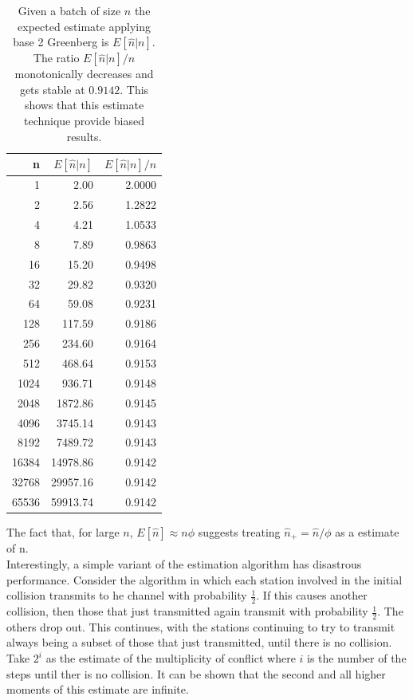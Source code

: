 \documentclass[12pt,a4paper]{report}
\begin{document}
\begin{table}[H]
\caption[\emph{Basic Greenberg} Expected Estimate]{Given a batch of size $n$ the expected estimate applying base 2 Greenberg is $E[\hat{n}|n]$. The ratio $E[\hat{n}|n]/n$ monotonically decreases and gets stable at $0.9142$. This shows that this estimate technique provide biased results.}
\begin{center}
\begin{tabular}{rD{.}{.}{5.2}D{.}{.}{1.4}}
 n &  &  \\ \hline {} &     2.00 &   2.0000 \\ 
2 &     2.56 &   1.2822 \\ 
4 &     4.21 &   1.0533 \\ 
8 &     7.89 &   0.9863 \\ 
16 &  15.20 &   0.9498 \\ 
32 &    29.82 &   0.9320 \\ 
64 &    59.08 &   0.9231 \\ 
128 &   117.59 &   0.9186 \\ 
256 &   234.60 &   0.9164 \\ 
512 &   468.64 &   0.9153 \\ 
1024 &   936.71 &   0.9148 \\ 
2048 &  1872.86 &   0.9145 \\ 
4096 &  3745.14 &   0.9143 \\ 
8192 &  7489.72 &   0.9143 \\ 
16384 & 14978.86 &   0.9142 \\ 
32768 & 29957.16 &   0.9142 \\ 
65536 & 59913.74 &   0.9142
\end{tabular}
\end{center}
\label{table:phi-Phi}
\end{table}
The fact that, for large $n$, $E[\hat{n}] \approx n\phi$ suggests treating $\hat{n}_{+} = \hat{n}/\phi$ as a estimate of n.\\


Interestingly, a simple variant of the estimation algorithm has disastrous performance. Consider the algorithm in which each station involved in the initial collision transmits to he channel with probability $\frac{1}{2}$. If this causes another collision, then those that just transmitted again transmit with probability $\frac{1}{2}$. The others drop out. This continues, with the stations continuing to try to transmit always being a subset of those that just transmitted, until there is no collision. Take $2^{i}$ as the estimate of the multiplicity of conflict where $i$ is the number of the steps until ther is no collision. It can be shown that the second and all higher moments of this estimate are infinite.
\end{document}
